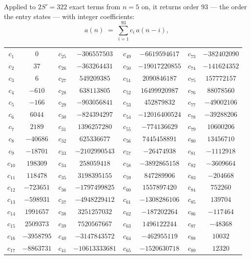 \documentclass[11pt,a4paper]{article}
\theoremstyle{plain}
\theoremstyle{definition}
\begin{document}
Applied to $2S'=322$ exact terms from $n=5$ on, it returns order $93$ --- the
order the entry states --- with integer coefficients:
\[
a(n)\;=\;\sum_{i=1}^{93}c_i\,a(n-i),
\]
\begin{center}\small
\begin{tabular}{cccccccc}
$c_{1}$ & $0$ & $c_{25}$ & $-306557503$ & $c_{49}$ & $-6619594617$ & $c_{73}$ & $-382402090$ \\
$c_{2}$ & $37$ & $c_{26}$ & $-363264431$ & $c_{50}$ & $-19017220855$ & $c_{74}$ & $-141624352$ \\
$c_{3}$ & $6$ & $c_{27}$ & $549209385$ & $c_{51}$ & $2090846187$ & $c_{75}$ & $157772157$ \\
$c_{4}$ & $-610$ & $c_{28}$ & $638113805$ & $c_{52}$ & $16499920987$ & $c_{76}$ & $88078560$ \\
$c_{5}$ & $-166$ & $c_{29}$ & $-903056841$ & $c_{53}$ & $452879832$ & $c_{77}$ & $-49002106$ \\
$c_{6}$ & $6044$ & $c_{30}$ & $-824394297$ & $c_{54}$ & $-12016400524$ & $c_{78}$ & $-39288206$ \\
$c_{7}$ & $2189$ & $c_{31}$ & $1396257280$ & $c_{55}$ & $-774136629$ & $c_{79}$ & $10600206$ \\
$c_{8}$ & $-40686$ & $c_{32}$ & $625336677$ & $c_{56}$ & $7445458891$ & $c_{80}$ & $13456710$ \\
$c_{9}$ & $-18701$ & $c_{33}$ & $-2102990543$ & $c_{57}$ & $-26474938$ & $c_{81}$ & $-1112918$ \\
$c_{10}$ & $198309$ & $c_{34}$ & $258059418$ & $c_{58}$ & $-3892865158$ & $c_{82}$ & $-3609664$ \\
$c_{11}$ & $118478$ & $c_{35}$ & $3198395155$ & $c_{59}$ & $847289906$ & $c_{83}$ & $-204668$ \\
$c_{12}$ & $-723651$ & $c_{36}$ & $-1797499825$ & $c_{60}$ & $1557897420$ & $c_{84}$ & $752260$ \\
$c_{13}$ & $-598931$ & $c_{37}$ & $-4948229412$ & $c_{61}$ & $-1308286106$ & $c_{85}$ & $139704$ \\
$c_{14}$ & $1991657$ & $c_{38}$ & $3251257032$ & $c_{62}$ & $-187202264$ & $c_{86}$ & $-117464$ \\
$c_{15}$ & $2509373$ & $c_{39}$ & $7520567667$ & $c_{63}$ & $1496122244$ & $c_{87}$ & $-48368$ \\
$c_{16}$ & $-3958795$ & $c_{40}$ & $-3147843572$ & $c_{64}$ & $-462955119$ & $c_{88}$ & $10032$ \\
$c_{17}$ & $-8863731$ & $c_{41}$ & $-10613333681$ & $c_{65}$ & $-1520630718$ & $c_{89}$ & $12320$ \\

\end{tabular}
\end{center}
\end{document}
